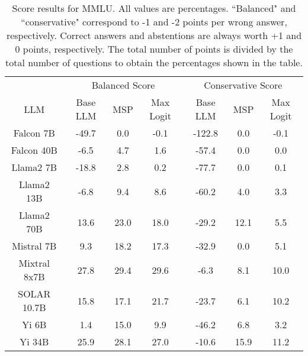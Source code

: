 \begin{table*}
\centering
\begin{tabular}{c|c|c|c|c|c|c}
& \multicolumn{3}{c|}{Balanced Score} & \multicolumn{3}{c}{Conservative Score} \\ 
LLM & Base LLM & MSP & Max Logit & Base LLM & MSP & Max Logit\\ \hline
Falcon 7B & -49.7 & 0.0 & -0.1 & -122.8 & 0.0 & -0.1\\
Falcon 40B & -6.5 & 4.7 & 1.6 & -57.4 & 0.0 & 0.0\\
Llama2 7B & -18.8 & 2.8 & 0.2 & -77.7 & 0.0 & 0.1\\
Llama2 13B & -6.8 & 9.4 & 8.6 & -60.2 & 4.0 & 3.3\\
Llama2 70B & 13.6 & 23.0 & 18.0 & -29.2 & 12.1 & 5.5\\
Mistral 7B & 9.3 & 18.2 & 17.3 & -32.9 & 0.0 & 5.1\\
Mixtral 8x7B & 27.8 & 29.4 & 29.6 & -6.3 & 8.1 & 10.0\\
SOLAR 10.7B & 15.8 & 17.1 & 21.7 & -23.7 & 6.1 & 10.2\\
Yi 6B & 1.4 & 15.0 & 9.9 & -46.2 & 6.8 & 3.2\\
Yi 34B & 25.9 & 28.1 & 27.0 & -10.6 & 15.9 & 11.2\\
\hline
\end{tabular}
\caption{Score results for MMLU. All values are percentages. ``Balanced" and ``conservative" correspond to -1 and -2 points per wrong answer, respectively. Correct answers and abstentions are always worth +1 and 0 points, respectively. The total number of points is divided by the total number of questions to obtain the percentages shown in the table.}
\label{tab:mmlu_score}
\end{table*}

